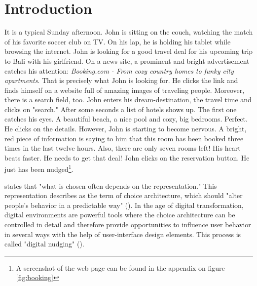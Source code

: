 \section{Introduction}
It is a typical Sunday afternoon. John is sitting on the couch, watching the match of his favorite soccer club on TV. On his lap, he is holding his tablet while browsing the internet. John is looking for a good travel deal for his upcoming trip to Bali with his girlfriend. On a news site, a prominent and bright advertisement catches his attention: \textit{Booking.com - From cozy country homes to funky city apartments}. That is precisely what John is looking for. He clicks the link and finds himself on a website full of amazing images of traveling people. Moreover, there is a search field, too. John enters his dream-destination, the travel time and clicks on "search." After some seconds a list of hotels shows up. The first one catches his eyes. A beautiful beach, a nice pool and cozy, big bedrooms. Perfect. He clicks on the details. However,  John is starting to become nervous. A bright, red piece of information is saying to him that this room has been booked three times in the last twelve hours. Also, there are only seven rooms left! His heart beats faster. He needs to get that deal! John clicks on the reservation button. He just has been nudged\footnote{A screenshot of the web page can be found in the appendix on figure \ref{fig:booking}}.


\cite{johnson_beyond_2012} states that "what is chosen often depends on the representation." This representation describes as the term of choice architecture, which should "alter people's behavior in a predictable way" (\cite{thaler_nudge:_2009}). In the age of digital transformation, digital environments are powerful tools where the choice architecture can be controlled in detail and therefore provide opportunities to influence user behavior in several ways with the help of user-interface design elements. This process is called "digital nudging" (\cite{weinmann_digital_2016}).

